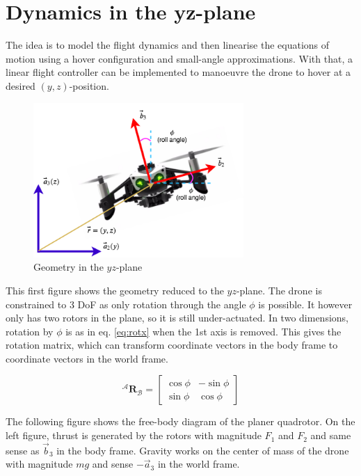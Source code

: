\documentclass[a4paper]{report}
\newcommand{\matr}[1]{\mathbf{#1}}
\begin{document}
\section{Dynamics in the yz-plane}

The idea is to model the flight dynamics and then linearise the equations of motion using a hover configuration and small-angle approximations. 
With that, a linear flight controller can be implemented to manoeuvre the drone to hover at a desired $(y,z)$-position.

\begin{figure}[H]
\centering
\includegraphics[width=8cm]{img/geo_planar.png}
\caption{Geometry in the $yz$-plane\label{fig:geo_planar}}
\end{figure}

This first figure shows the geometry reduced to the $yz$-plane. 
The drone is constrained to 3 \gls{DoF} as only rotation through the angle $\phi$ is possible. 
It however only has two rotors in the plane, so it is still under-actuated.
In two dimensions, rotation by $\phi$ is as in eq. \ref{eq:rotx} when the 1st axis is removed. 
This gives the rotation matrix, which can transform coordinate vectors in the body frame to coordinate vectors in the world frame.

\begin{equation}
\matr{^\mathcal{A}R_\mathcal{B}} = 
\begin{bmatrix}
\cos\phi & -\sin\phi \\
\sin\phi & \cos\phi
\end{bmatrix}
\end{equation}

The following figure shows the free-body diagram of the planer quadrotor.
On the left figure, thrust is generated by the rotors with magnitude $F_1$ and $F_2$ and same sense as $\vec{b}_3$ in the body frame. Gravity works on the center of mass of the drone with magnitude $mg$ and sense $-\vec{a}_3$ in the world frame.
\end{document}
